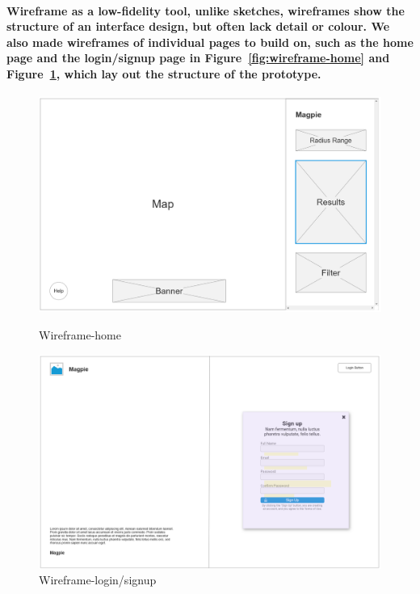 \paragraph{Wireframe as a low-fidelity tool, unlike sketches, wireframes show the structure of an interface design, but often lack detail or colour. We also made wireframes of individual pages to build on, such as the home page and the login/signup page in Figure~\ref{fig:wireframe-home} and Figure~\ref{fig:wireframe-signup}, which lay out the structure of the prototype.}
\begin{figure}[h]
    \centering
    \begin{minipage}{0.48\textwidth}
        \centering
        \includegraphics[width=\textwidth]{images/wireframe-home.jpg}
        \caption{Wireframe-home}
        \label{fig:wireframe-home}
    \end{minipage}
    \hfill
    \begin{minipage}{0.48\textwidth}
        \centering
        \includegraphics[width=\textwidth]{images/wireframe-signup.jpg}
        \caption{Wireframe-login/signup}
        \label{fig:wireframe-signup}
    \end{minipage}
\end{figure}

